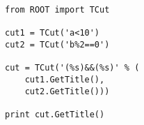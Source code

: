 \begin{footnotesize}
\begin{verbatim}
from ROOT import TCut

cut1 = TCut('a<10')
cut2 = TCut('b%2==0')

cut = TCut('(%s)&&(%s)' % (
    cut1.GetTitle(),
    cut2.GetTitle()))

print cut.GetTitle()
\end{verbatim}
\end{footnotesize}
